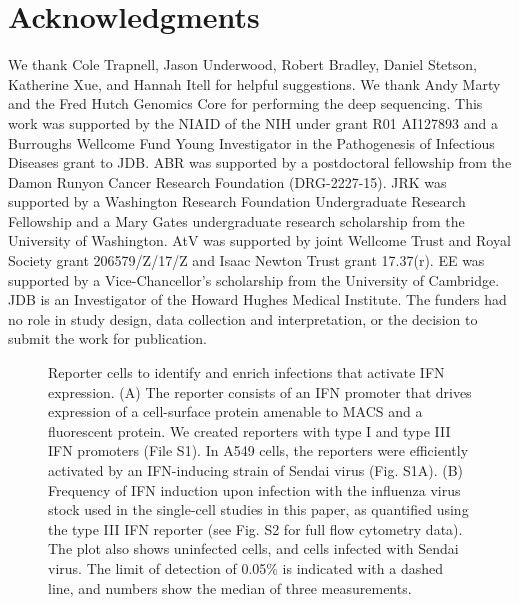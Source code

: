 \documentclass[]{article}
\begin{document}
\section*{Acknowledgments}
We thank Cole Trapnell, Jason Underwood, Robert Bradley, Daniel Stetson, Katherine Xue, and Hannah Itell for helpful suggestions.
We thank Andy Marty and the Fred Hutch Genomics Core for performing the deep sequencing.
This work was supported by the NIAID of the NIH under grant R01 AI127893 and a Burroughs Wellcome Fund Young Investigator in the Pathogenesis of Infectious Diseases grant to JDB.
ABR was supported by a postdoctoral fellowship from the Damon Runyon Cancer Research Foundation (DRG-2227-15).
JRK was supported by a Washington Research Foundation Undergraduate Research Fellowship and a Mary Gates undergraduate research scholarship from the University of Washington.
AtV was supported by joint Wellcome Trust and Royal Society grant 206579/Z/17/Z and Isaac Newton Trust grant 17.37(r).
EE was supported by a Vice-Chancellor's scholarship from the University of Cambridge.
JDB is an Investigator of the Howard Hughes Medical Institute.
The funders had no role in study design, data collection and interpretation, or the decision to submit the work for publication.


\clearpage

\begin{figure}
\caption{
Reporter cells to identify and enrich infections that activate IFN expression.
(A) The reporter consists of an IFN promoter that drives expression of a cell-surface protein amenable to MACS and a fluorescent protein.
We created reporters with type I and type III IFN promoters (File S1).
In A549 cells, the reporters were efficiently activated by an IFN-inducing strain of Sendai virus (Fig. S1A).
(B)
Frequency of IFN induction upon infection with the influenza virus stock used in the single-cell studies in this paper, as quantified using the type III IFN reporter (see Fig. S2 for full flow cytometry data).
The plot also shows uninfected cells, and cells infected with Sendai virus.
The limit of detection of 0.05\% is indicated with a dashed line, and numbers show the median of three measurements.
}
\end{figure}
\end{document}

